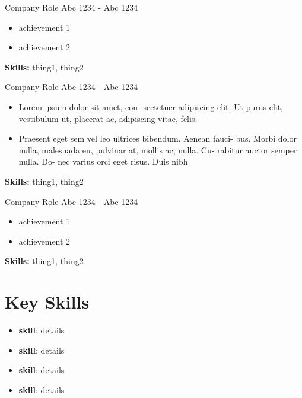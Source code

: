 \documentclass{smart-cv}
\begin{document}
\begin{two-col}
    \begin{job}
      {Company}
      {Role}
      {Abc 1234 - Abc 1234}
      \begin{itemize}
        \item achievement 1
        \item achievement 2
      \end{itemize}
      \textbf{Skills:} thing1, thing2
    \end{job}

    \begin{job}
      {Company}
      {Role}
      {Abc 1234 - Abc 1234}
      \begin{itemize}
        \item Lorem ipsum dolor sit amet, con- sectetuer adipiscing elit. Ut
          purus elit, vestibulum ut, placerat ac, adipiscing vitae, felis.
        \item Praesent eget sem vel leo ultrices bibendum. Aenean fauci- bus.
          Morbi dolor nulla, malesuada eu, pulvinar at, mollis ac, nulla. Cu-
          rabitur auctor semper nulla. Do- nec varius orci eget risus. Duis
          nibh
      \end{itemize}
      \textbf{Skills:} thing1, thing2
    \end{job}
  \end{two-col}

  \pagebreak

  \begin{job}
    {Company}
    {Role}
    {Abc 1234 - Abc 1234}
    \begin{itemize}
      \item achievement 1
      \item achievement 2
    \end{itemize}
    \textbf{Skills:} thing1, thing2
  \end{job}

  \section{Key Skills}

  \begin{itemize}
    \item \textbf{skill}: details
    \item \textbf{skill}: details
    \item \textbf{skill}: details
    \item \textbf{skill}: details
  \end{itemize}
\end{document}
